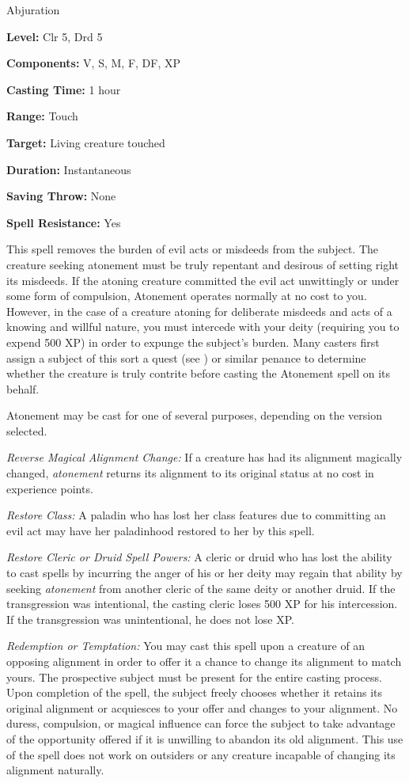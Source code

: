
Abjuration

\textbf{Level:} Clr 5, Drd 5

\textbf{Components:} V, S, M, F, DF, XP

\textbf{Casting Time:} 1 hour

\textbf{Range:} Touch

\textbf{Target:} Living creature touched

\textbf{Duration:} Instantaneous

\textbf{Saving Throw:} None

\textbf{Spell Resistance:} Yes

This spell removes the burden of evil acts or misdeeds from the subject. The creature 
seeking atonement must be truly repentant and desirous of setting right its misdeeds. 
If the atoning creature committed the evil act unwittingly or under some form of 
compulsion, Atonement operates normally at no cost to you. However, in 
the case of a creature atoning for deliberate misdeeds and acts of a knowing and 
willful nature, you must intercede with your deity (requiring you to expend 500 
XP) in order to expunge the subject's burden. Many casters first assign a subject 
of this sort a quest (see ) or similar penance to determine 
whether the creature is truly contrite before casting the Atonement spell 
on its behalf.

Atonement may be cast for one of several purposes, depending on the version 
selected.

\textit{Reverse Magical Alignment Change:} If a creature has had its alignment 
magically changed, \textit{atonement} returns its alignment to its original status 
at no cost in experience points.

\textit{Restore Class:} A paladin who has lost her class features due to committing 
an evil act may have her paladinhood restored to her by this spell.

\textit{Restore Cleric or Druid Spell Powers:} A cleric or druid who has lost the 
ability to cast spells by incurring the anger of his or her deity may regain that 
ability by seeking \textit{atonement} from another cleric of the same deity or 
another druid. If the transgression was intentional, the casting cleric loses 500 
XP for his intercession. If the transgression was unintentional, he does not lose 
XP.

\textit{Redemption or Temptation:} You may cast this spell upon a creature of an 
opposing alignment in order to offer it a chance to change its alignment to match 
yours. The prospective subject must be present for the entire casting process. 
Upon completion of the spell, the subject freely chooses whether it retains its 
original alignment or acquiesces to your offer and changes to your alignment. No 
duress, compulsion, or magical influence can force the subject to take advantage 
of the opportunity offered if it is unwilling to abandon its old alignment. This 
use of the spell does not work on outsiders or any creature incapable of changing 
its alignment naturally.


